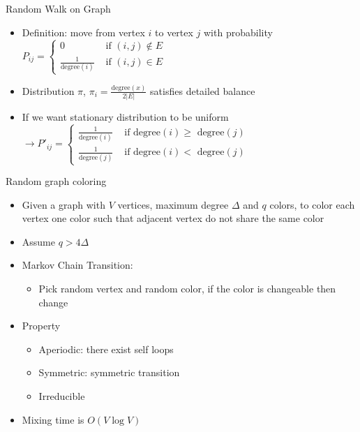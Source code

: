 \documentclass[a4paper]{article}
\begin{document}
\begin{itemize}
\begin{itemize}
                Random Walk on Graph
                \begin{itemize}
                    \item Definition: move from vertex $i$ to vertex $j$ with probability $P_{ij} = \left\{ \begin{array}{cc} 0 & \text{ if $(i, j) \not \in E$ } \\ \frac{1}{\text{degree}(i)} & \text{ if $(i, j) \in E$ } \end{array} \right.$
                    \item Distribution $\pi$, $\pi_i = \frac{\text{degree}(x)}{2 |E|}$ satisfies detailed balance
                    \item If we want stationary distribution to be uniform $\rightarrow P'_{ij} = \left\{ \begin{array}{cc} \frac{1}{\text{degree}(i)} & \text{ if degree$(i) \geq$ degree$(j)$ } \\ \frac{1}{\text{degree}(j)} & \text{ if degree$(i) < $ degree$(j)$ } \end{array} \right.$
                \end{itemize}
                Random graph coloring
                \begin{itemize}
                    \item Given a graph with $V$ vertices, maximum degree $\Delta$ and $q$ colors, to color each vertex one color such that adjacent vertex do not share the same color
                    \item Assume $q > 4 \Delta$
                    \item Markov Chain Transition:
                        \begin{itemize}
                            \item Pick random vertex and random color, if the color is changeable then change
                        \end{itemize}
                    \item Property
                        \begin{itemize}
                            \item Aperiodic: there exist self loops
                            \item Symmetric: symmetric transition
                            \item Irreducible
                        \end{itemize}
                    \item Mixing time is $O(V \log V)$


\end{itemize}
\end{itemize}
\end{itemize}
\end{document}
